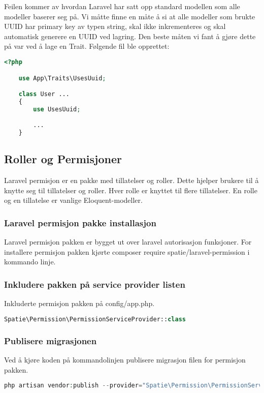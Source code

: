 Feilen kommer av hvordan Laravel har satt opp standard modellen som alle modeller baserer seg på.
Vi måtte finne en måte å si at alle modeller som brukte UUID har primary key av typen string, skal ikke inkrementeres og skal automatisk generere en UUID ved lagring.
Den beste måten vi fant å gjøre dette på var ved å lage en Trait. Følgende fil ble opprettet:


\begin{lstlisting}[caption={Bruk av UUID trait i modell} language=PHP]
    <?php

    use App\Traits\UsesUuid;

    class User ...
    {
        use UsesUuid;

        ...
    }
\end{lstlisting}



\subsection{Roller og Permisjoner}\cite{spatie2019aupar}
Laravel permisjon er en pakke med tillatelser og roller. Dette hjelper brukere til å knytte seg til tillatelser og roller. Hver rolle er knyttet til flere tillatelser. En rolle og en tillatelse er vanlige Eloquent-modeller\cite{oki2017uail}.
\subsubsection{Laravel permisjon pakke installasjon}
Laravel permisjon pakken er bygget ut over laravel autorisasjon funksjoner\cite{laravelnewsn2017tblp}.
For installere permisjon pakken kjørte composer require spatie/laravel-permission i kommando linje.

\subsubsection{Inkludere pakken på service provider listen}
Inkluderte permisjon pakken på config/app.php.
\begin{lstlisting}[language=PHP]
    Spatie\Permission\PermissionServiceProvider::class
\end{lstlisting}

\subsubsection{Publisere migrasjonen}
Ved å kjøre koden på kommandolinjen publisere migrasjon filen for permisjon pakken.
\begin{lstlisting}[language=PHP]
   php artisan vendor:publish --provider="Spatie\Permission\PermissionServiceProvider" --tag="migrations"
\end{lstlisting}

